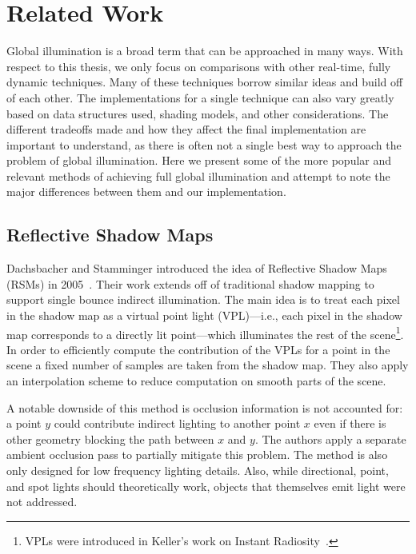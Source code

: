 \chapter{Related Work}

Global illumination is a broad term that can be approached in many ways. With respect to this thesis, we only focus on comparisons with other real-time, fully dynamic techniques. Many of these techniques borrow similar ideas and build off of each other. The implementations for a single technique can also vary greatly based on data structures used, shading models, and other considerations. The different tradeoffs made and how they affect the final implementation are important to understand, as there is often not a single best way to approach the problem of global illumination. Here we present some of the more popular and relevant methods of achieving full global illumination and attempt to note the major differences between them and our implementation.

\section{Reflective Shadow Maps}
Dachsbacher and Stamminger introduced the idea of Reflective Shadow Maps (RSMs) in 2005~\cite{Dachsbacher:2005:RSM:1053427.1053460}. Their work extends off of traditional shadow mapping to support single bounce indirect illumination. The main idea is to treat each pixel in the shadow map as a virtual point light (VPL)---i.e., each pixel in the shadow map corresponds to a directly lit point---which illuminates the rest of the scene\footnote{VPLs were introduced in Keller's work on Instant Radiosity~\cite{Keller:1997:IR:258734.258769}.}. In order to efficiently compute the contribution of the VPLs for a point in the scene a fixed number of samples are taken from the shadow map. They also apply an interpolation scheme to reduce computation on smooth parts of the scene.

A notable downside of this method is occlusion information is not accounted for: a point $y$ could contribute indirect lighting to another point $x$ even if there is other geometry blocking the path between $x$ and $y$. The authors apply a separate ambient occlusion pass to partially mitigate this problem. The method is also only designed for low frequency lighting details. Also, while directional, point, and spot lights should theoretically work, objects that themselves emit light were not addressed.



